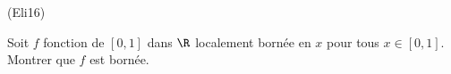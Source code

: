 \begin{tiny}(Eli16)\end{tiny} Soit $f$ fonction de $\left[ 0,1 \right]$ dans $\R$ localement bornée en $x$ pour tous $x\in \left[ 0,1 \right]$. Montrer que $f$ est bornée.
